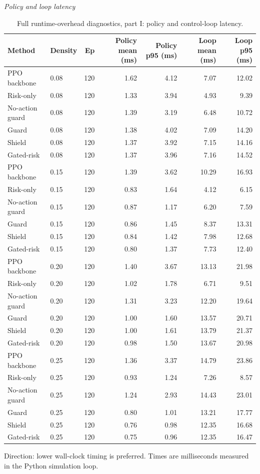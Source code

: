 \begin{table}[!htbp]
\centering
\caption{Full runtime-overhead diagnostics, part I: policy and control-loop latency.}
\label{tab_runtime}
\tiny
\setlength{\tabcolsep}{3.2pt}
\renewcommand{\arraystretch}{1.04}
\textit{Policy and loop latency}\par
\begin{tabular}{@{}llrrrrr@{}}
\toprule
Method & Density & Ep & Policy mean (ms) & Policy p95 (ms) & Loop mean (ms) & Loop p95 (ms) \\
\midrule
PPO backbone & 0.08 & 120 & 1.62 & 4.12 & 7.07 & 12.02 \\
Risk-only & 0.08 & 120 & 1.33 & 3.94 & 4.93 & 9.39 \\
No-action guard & 0.08 & 120 & 1.39 & 3.19 & 6.48 & 10.72 \\
Guard & 0.08 & 120 & 1.38 & 4.02 & 7.09 & 14.20 \\
Shield & 0.08 & 120 & 1.37 & 3.92 & 7.15 & 14.16 \\
Gated-risk & 0.08 & 120 & 1.37 & 3.96 & 7.16 & 14.52 \\
PPO backbone & 0.15 & 120 & 1.39 & 3.62 & 10.29 & 16.93 \\
Risk-only & 0.15 & 120 & 0.83 & 1.64 & 4.12 & 6.15 \\
No-action guard & 0.15 & 120 & 0.87 & 1.17 & 6.20 & 7.59 \\
Guard & 0.15 & 120 & 0.86 & 1.45 & 8.37 & 13.31 \\
Shield & 0.15 & 120 & 0.84 & 1.42 & 7.98 & 12.68 \\
Gated-risk & 0.15 & 120 & 0.80 & 1.37 & 7.73 & 12.40 \\
PPO backbone & 0.20 & 120 & 1.40 & 3.67 & 13.13 & 21.98 \\
Risk-only & 0.20 & 120 & 1.02 & 1.78 & 6.71 & 9.51 \\
No-action guard & 0.20 & 120 & 1.31 & 3.23 & 12.20 & 19.64 \\
Guard & 0.20 & 120 & 1.00 & 1.60 & 13.57 & 20.71 \\
Shield & 0.20 & 120 & 1.00 & 1.61 & 13.79 & 21.37 \\
Gated-risk & 0.20 & 120 & 0.98 & 1.50 & 13.67 & 20.98 \\
PPO backbone & 0.25 & 120 & 1.36 & 3.37 & 14.79 & 23.86 \\
Risk-only & 0.25 & 120 & 0.93 & 1.24 & 7.26 & 8.57 \\
No-action guard & 0.25 & 120 & 1.24 & 2.93 & 14.43 & 23.01 \\
Guard & 0.25 & 120 & 0.80 & 1.01 & 13.21 & 17.77 \\
Shield & 0.25 & 120 & 0.76 & 0.98 & 12.35 & 16.68 \\
Gated-risk & 0.25 & 120 & 0.75 & 0.96 & 12.35 & 16.47 \\
\bottomrule
\end{tabular}
\begin{tablenotes}
\item Direction: lower wall-clock timing is preferred. Times are milliseconds measured in the Python simulation loop.
\end{tablenotes}
\end{table}


